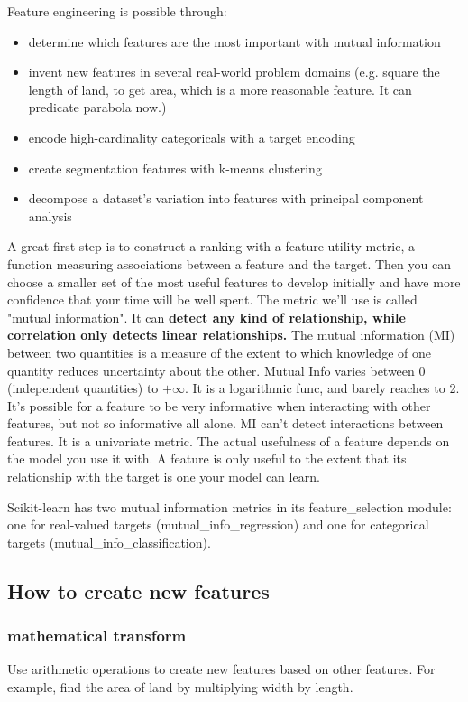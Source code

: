 \documentclass[12pt]{report}
\begin{document}
Feature engineering is possible through:
\begin{itemize}
  \item determine which features are the most important with mutual information
  \item invent new features in several real-world problem domains (e.g. square the length of land, to get area, which is a more reasonable feature. It can predicate parabola now.)
  \item encode high-cardinality categoricals with a target encoding
  \item create segmentation features with k-means clustering
  \item decompose a dataset's variation into features with principal component analysis
\end{itemize}

A great first step is to construct a ranking with a feature utility metric, a function measuring associations between a feature and the target. Then you can choose a smaller set of the most useful features to develop initially and have more confidence that your time will be well spent. The metric we'll use is called "mutual information". It can \textbf{detect any kind of relationship, while correlation only detects linear relationships.} The mutual information (MI) between two quantities is a measure of the extent to which knowledge of one quantity reduces uncertainty about the other. Mutual Info varies between 0 (independent quantities) to $+ \infty $. It is a logarithmic func, and barely reaches to 2. It's possible for a feature to be very informative when interacting with other features, but not so informative all alone. MI can't detect interactions between features. It is a univariate metric.
The actual usefulness of a feature depends on the model you use it with. A feature is only useful to the extent that its relationship with the target is one your model can learn.

Scikit-learn has two mutual information metrics in its feature\_selection module: one for real-valued targets (mutual\_info\_regression) and one for categorical targets (mutual\_info\_classification).

\subsection{How to create new features}

\subsubsection{mathematical transform}
Use arithmetic operations to create new features based on other features. For example, find the area of land by multiplying width by length.
\end{document}
